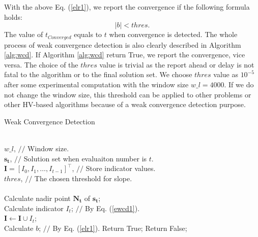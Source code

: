 \documentclass[conference]{IEEEtran}
\begin{document}
With the above Eq. (\ref{elr1}), we report the convergence if the following
formula holds:
\begin{equation}\label{elr2}
  \lvert b \rvert < thres. 
\end{equation}
The value of $t_{Converged}$ equals to $t$ when convergence is detected. 
The whole process of weak convergence detection is also clearly described in Algorithm \ref{alg:wcd}. 
If Algorithm \ref{alg:wcd} return True, we report the convergence, vice versa. 
The choice of the $thres$ value is trivial 
as the report ahead or delay is not fatal to the algorithm or to the final solution set.
We choose $thres$ value as $10^{-5}$ after some experimental computation with 
the window size $w\_ l = 4000$. 
If we do not change the window size, 
this threshold can be applied to other problems or other HV-based algorithms
because of a weak convergence detection purpose.

\begin{algorithm}
  \caption{Weak Convergence Detection}
  \label{alg:wcd}
  \begin{algorithmic}
  \REQUIRE ~~\\
    $w\_l$, $//$ Window size.\\
    $\boldsymbol{s_{t}}$, $//$ Solution set when evaluaiton number is $t$.\\
    $\boldsymbol I = [I_{0},I_{1},\dots,I_{t-1}]^\top$, $//$ Store indicator values. \\
    $thres$, $//$ The chosen threshold for slope. \\ 
  \ENSURE ~~\\
    Calculate nadir point $\boldsymbol{N_{t}}$ of $\boldsymbol{s_{t}}$; \\
    Calculate indicator $I_{t}$; $//$ By Eq. (\ref{ewcd1}). \\
    $\boldsymbol I \gets \boldsymbol I \cup I_{t}$; \\
    \STATE Calculate $b$; $//$ By Eq. (\ref{elr1}).
      \STATE Return True;
      \ENDIF
    \ENDIF
    \STATE Return False;
  \end{algorithmic}
\end{algorithm}
% 
% 
%
\end{document}

